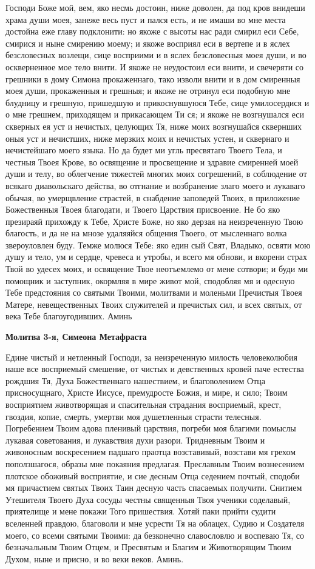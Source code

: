 Господи Боже мой, вем, яко несмь достоин, ниже доволен, да под кров внидеши храма души моея, занеже весь пуст и пался есть, и не имаши во мне места достойна еже главу подклонити: но якоже с высоты нас ради смирил еси Себе, смирися и ныне смирению моему; и якоже восприял еси в вертепе и в яслех безсловесных возлещи, сице восприими и в яслех безсловесныя моея души, и во оскверненное мое тело внити. И якоже не неудостоил еси внити, и свечеряти со грешники в дому Симона прокаженнаго, тако изволи внити и в дом смиренныя моея души, прокаженныя и грешныя; и якоже не отринул еси подобную мне блудницу и грешную, пришедшую и прикоснувшуюся Тебе, сице умилосердися и о мне грешнем, приходящем и прикасающем Ти ся; и якоже не возгнушался еси скверных ея уст и нечистых, целующих Тя, ниже моих возгнушайся сквернших оныя уст и нечистших, ниже мерзких моих и нечистых устен, и сквернаго и нечистейшаго моего языка. Но да будет ми угль пресвятаго Твоего Тела, и честныя Твоея Крове, во освящение и просвещение и здравие смиренней моей души и телу, во облегчение тяжестей многих моих согрешений, в соблюдение от всякаго диавольскаго действа, во отгнание и возбранение злаго моего и лукаваго обычая, во умерщвление страстей, в снабдение заповедей Твоих, в приложение Божественныя Твоея благодати, и Твоего Царствия присвоение. Не бо яко презираяй прихожду к Тебе, Христе Боже, но яко дерзая на неизреченную Твою благость, и да не на мнозе удаляяйся общения Твоего, от мысленнаго волка звероуловлен буду. Темже молюся Тебе: яко един сый Свят, Владыко, освяти мою душу и тело, ум и сердце, чревеса и утробы, и всего мя обнови, и вкорени страх Твой во удесех моих, и освящение Твое неотъемлемо от мене сотвори; и буди ми помощник и заступник, окормляя в мире живот мой, сподобляя мя и одесную Тебе предстояния со святыми Твоими, молитвами и моленьми Пречистыя Твоея Матере, невещественных Твоих служителей и пречистых сил, и всех святых, от века Тебе благоугодивших. Аминь


\medskip
\bfseries Молитва 3-я, Симеона Метафраста\normalfont{}


Едине чистый и нетленный Господи, за неизреченную милость человеколюбия наше все восприемый смешение, от чистых и девственных кровей паче естества рождшия Тя, Духа Божественнаго нашествием, и благоволением Отца присносущнаго, Христе Иисусе, премудросте Божия, и мире, и сило; Твоим восприятием животворящая и спасительная страдания восприемый, крест, гвоздия, копие, смерть, умертви моя душетленныя страсти телесныя. Погребением Твоим адова пленивый царствия, погреби моя благими помыслы лукавая советования, и лукавствия духи разори. Тридневным Твоим и живоносным воскресением падшаго праотца возставивый, возстави мя грехом поползшагося, образы мне покаяния предлагая. Преславным Твоим вознесением плотское обоживый восприятие, и сие десным Отца седением почтый, сподоби мя причастием святых Твоих Таин десную часть спасаемых получити. Снитием Утешителя Твоего Духа сосуды честны священныя Твоя ученики соделавый, приятелище и мене покажи Того пришествия. Хотяй паки прийти судити вселенней правдою, благоволи и мне усрести Тя на облацех, Судию и Создателя моего, со всеми святыми Твоими: да безконечно славословлю и воспеваю Тя, со безначальным Твоим Отцем, и Пресвятым и Благим и Животворящим Твоим Духом, ныне и присно, и во веки веков. Аминь.


